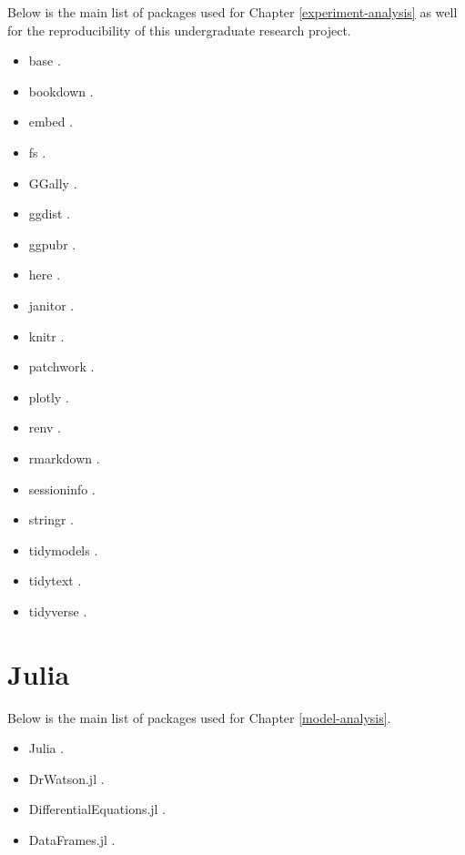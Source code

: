 \documentclass[
  12pt,
  a4paper,
  oneside]{krantz}
\providecommand{\tightlist}{%
  \setlength{\itemsep}{0pt}\setlength{\parskip}{0pt}}
\begin{document}
Below is the main list of packages used for Chapter
\ref{experiment-analysis} as well for the reproducibility of this
undergraduate research project.

\begin{itemize}
\tightlist
\item
  base \citep{R-base}.
\item
  bookdown \citep{R-bookdown}.
\item
  embed \citep{R-embed}.
\item
  fs \citep{R-fs}.
\item
  GGally \citep{R-GGally}.
\item
  ggdist \citep{R-ggdist}.
\item
  ggpubr \citep{R-ggpubr}.
\item
  here \citep{R-here}.
\item
  janitor \citep{R-janitor}.
\item
  knitr \citep{R-knitr}.
\item
  patchwork \citep{R-patchwork}.
\item
  plotly \citep{R-plotly}.
\item
  renv \citep{R-renv}.
\item
  rmarkdown \citep{R-rmarkdown}.
\item
  sessioninfo \citep{R-sessioninfo}.
\item
  stringr \citep{R-stringr}.
\item
  tidymodels \citep{R-tidymodels}.
\item
  tidytext \citep{R-tidytext}.
\item
  tidyverse \citep{R-tidyverse}.
\end{itemize}

\hypertarget{julia}{%
\section{Julia}\label{julia}}

Below is the main list of packages used for Chapter
\ref{model-analysis}.

\begin{itemize}
\tightlist
\item
  Julia \citep{Julia-2017}.
\item
  DrWatson.jl \citep{datseris2020}.
\item
  DifferentialEquations.jl \citep{rackauckas2017differentialequations, rackauckas2017adaptive, rackauckas_stability-optimized_2018}.
\item
  DataFrames.jl \citep{white2021}.
\end{itemize}
\end{document}
